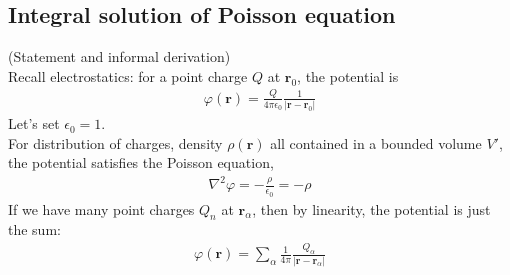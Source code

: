 \documentclass[a4paper]{article}
\begin{document}
\subsection{Integral solution of Poisson equation}
(Statement and informal derivation)\\
Recall electrostatics: for a point charge $Q$ at $\mathbf{r}_0$, the potential is
\begin{equation*}
\begin{aligned}
\varphi\left(\mathbf{r}\right) = \frac{Q}{4\pi \epsilon_0} \frac{1}{|\mathbf{r}-\mathbf{r}_0|}
\end{aligned}
\end{equation*}
Let's set $\epsilon_0 = 1$.\\
For distribution of charges, density $\rho\left(\mathbf{r}\right)$ all contained in a bounded volume $V'$, the potential satisfies the Poisson equation,
\begin{equation*}
\begin{aligned}
\nabla^2 \varphi = -\frac{\rho}{\epsilon_0} = -\rho
\end{aligned}
\end{equation*}
If we have many point charges $Q_n$ at $\mathbf{r}_\alpha$, then by linearity, the potential is just  the sum:
\begin{equation*}
\begin{aligned}
\varphi\left(\mathbf{r}\right) = \sum_\alpha \frac{1}{4\pi} \frac{Q_\alpha}{|\mathbf{r}-\mathbf{r}_\alpha|}
\end{aligned}
\end{equation*}
\end{document}
